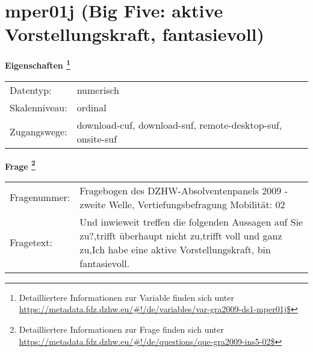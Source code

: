 
    \setcounter{footnote}{0}

    \vspace*{-1.8cm}
	\section{mper01j (Big Five: aktive Vorstellungskraft, fantasievoll)}
	\label{section:mper01j}



    \vspace*{0.5cm}
    \noindent\textbf{Eigenschaften
	\footnote{Detailliertere Informationen zur Variable finden sich unter
		\url{https://metadata.fdz.dzhw.eu/\#!/de/variables/var-gra2009-ds1-mper01j$}}}\\
	\begin{tabularx}{\hsize}{@{}lX}
	Datentyp: & numerisch \\
	Skalenniveau: & ordinal \\
	Zugangswege: &
	  download-cuf, 
	  download-suf, 
	  remote-desktop-suf, 
	  onsite-suf
 \\
    \end{tabularx}



				\vspace*{0.5cm}
                \noindent\textbf{Frage
	                \footnote{Detailliertere Informationen zur Frage finden sich unter
		              \url{https://metadata.fdz.dzhw.eu/\#!/de/questions/que-gra2009-ins5-02$}}}\\
				\begin{tabularx}{\hsize}{@{}lX}
					Fragenummer: &
					  Fragebogen des DZHW-Absolventenpanels 2009 - zweite Welle, Vertiefungsbefragung Mobilität:
					  02
 \\
					Fragetext: & Und inwieweit treffen die folgenden Aussagen auf Sie zu?,trifft überhaupt nicht zu,trifft voll und ganz zu,Ich habe eine aktive Vorstellungskraft, bin fantasievoll. \\
				\end{tabularx}





